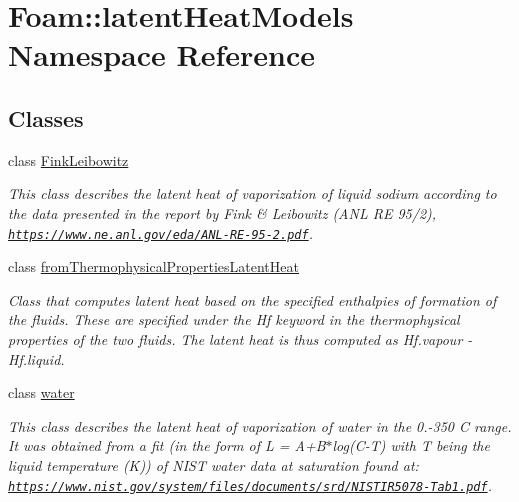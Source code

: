 \hypertarget{namespaceFoam_1_1latentHeatModels}{}\section{Foam\+:\+:latent\+Heat\+Models Namespace Reference}
\label{namespaceFoam_1_1latentHeatModels}
\subsection*{Classes}
\begin{DoxyCompactItemize}
\item 
class \hyperlink{classFoam_1_1latentHeatModels_1_1FinkLeibowitz}{Fink\+Leibowitz}
\begin{DoxyCompactList}\small\item\em This class describes the latent heat of vaporization of liquid sodium according to the data presented in the report by Fink \& Leibowitz (A\+NL RE 95/2), \href{https://www.ne.anl.gov/eda/ANL-RE-95-2.pdf}{\tt https\+://www.\+ne.\+anl.\+gov/eda/\+A\+N\+L-\/\+R\+E-\/95-\/2.\+pdf}. \end{DoxyCompactList}\item 
class \hyperlink{classFoam_1_1latentHeatModels_1_1fromThermophysicalPropertiesLatentHeat}{from\+Thermophysical\+Properties\+Latent\+Heat}
\begin{DoxyCompactList}\small\item\em Class that computes latent heat based on the specified enthalpies of formation of the fluids. These are specified under the Hf keyword in the thermophysical properties of the two fluids. The latent heat is thus computed as Hf.\+vapour -\/ Hf.\+liquid. \end{DoxyCompactList}\item 
class \hyperlink{classFoam_1_1latentHeatModels_1_1water}{water}
\begin{DoxyCompactList}\small\item\em This class describes the latent heat of vaporization of water in the 0.-\/350 C range. It was obtained from a fit (in the form of L = A+\+B$\ast$log(C-\/T) with T being the liquid temperature (K)) of N\+I\+ST water data at saturation found at\+: \href{https://www.nist.gov/system/files/documents/srd/NISTIR5078-Tab1.pdf}{\tt https\+://www.\+nist.\+gov/system/files/documents/srd/\+N\+I\+S\+T\+I\+R5078-\/\+Tab1.\+pdf}. \end{DoxyCompactList}\end{DoxyCompactItemize}
